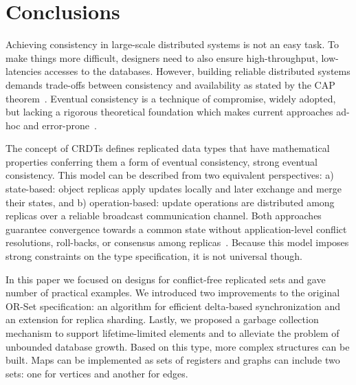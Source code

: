 \section{Conclusions}
\label{sec:conclusions}

Achieving consistency in large-scale distributed systems is not an easy task. To
make things more difficult, designers need to also ensure high-throughput,
low-latencies accesses to the databases. However, building reliable distributed
systems demands trade-offs between consistency and availability as stated by the
CAP theorem~\cite{Gilbert:2002:BCF:564585.564601}. Eventual consistency is a
technique of compromise, widely adopted, but lacking a rigorous theoretical
foundation which makes current approaches ad-hoc and
error-prone~\cite{DeCandia:2007:DAH:1294261.1294281}.

The concept of CRDTs defines replicated data types that have mathematical
properties conferring them a form of eventual consistency, strong eventual
consistency. This model can be described from two equivalent perspectives:
a) state-based: object replicas apply updates locally and later exchange and
merge their states, and b) operation-based: update operations are distributed
among replicas over a reliable broadcast communication channel. Both approaches
guarantee convergence towards a common state without application-level conflict
resolutions, roll-backs, or consensus among
replicas~\cite{Terry:1995:MUC:224056.224070}. Because this model imposes strong
constraints on the type specification, it is not universal though.

In this paper we focused on designs for conflict-free replicated sets and gave
number of practical examples. We introduced two improvements to the original
OR-Set specification: an algorithm for efficient delta-based synchronization and
an extension for replica sharding. Lastly, we proposed a garbage collection
mechanism to support lifetime-limited elements and to alleviate the problem of
unbounded database growth. Based on this type, more complex structures can be
built. Maps can be implemented as sets of registers and graphs can include two
sets: one for vertices and another for edges.
